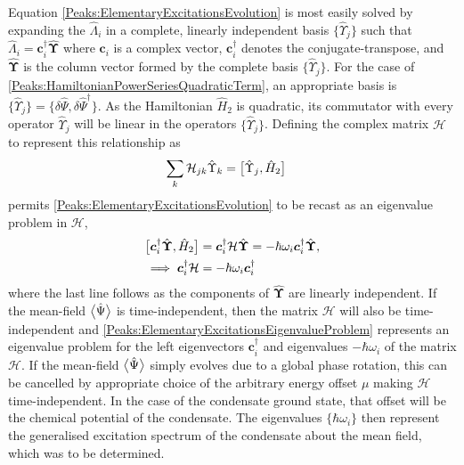 Equation \eqref{Peaks:ElementaryExcitationsEvolution} is most easily solved by expanding the $\hat{\Lambda}_i$ in a complete, linearly independent basis $\{\hat{\Upsilon}_j\}$ such that $\hat{\Lambda}_i = \bm{c}_i^\dagger \hat{\bm{\Upsilon}}$ where $\bm{c}_i$ is a complex vector, $\bm{c}_i^\dagger$ denotes the conjugate-transpose, and $\hat{\bm{\Upsilon}}$ is the column vector formed by the complete basis $\{\hat{\Upsilon}_j\}$. For the case of \eqref{Peaks:HamiltonianPowerSeriesQuadraticTerm}, an appropriate basis is $\{\hat{\Upsilon}_j\} = \{\delta\hat{\Psi}, \delta\hat{\Psi}^\dagger\}$. As the Hamiltonian $\hat{H}_2$ is quadratic, its commutator with every operator $\hat{\Upsilon}_j$ will be linear in the operators $\{\hat{\Upsilon}_j\}$. Defining the complex matrix $\mathcal{H}$ to represent this relationship as
\begin{align}
    \label{Peaks:ScriptHRelationshipToHamiltonian}
    \sum_k \mathcal{H}_{jk} \hat{\Upsilon}_k &= \comm{\hat{\Upsilon}_j, \hat{H}_2}
\end{align}
permits \eqref{Peaks:ElementaryExcitationsEvolution} to be recast as an eigenvalue problem in $\mathcal{H}$,
\begin{align}
    \comm{\bm{c}_i^\dagger \hat{\bm{\Upsilon}}, \hat{H}_2} &= \bm{c}_i^\dagger \mathcal{H} \hat{\bm{\Upsilon}} = - \hbar \omega_i \bm{c}_i^\dagger \hat{\bm{\Upsilon}}, \label{Peaks:ElementaryExcitationsEigenvalueProblemWithOperators}\\
    \implies \bm{c}_i^\dagger \mathcal{H} &= - \hbar \omega_i \bm{c}_i^\dagger \label{Peaks:ElementaryExcitationsEigenvalueProblem}
\end{align}
where the last line follows as the components of $\hat{\bm{\Upsilon}}$ are linearly independent. If the mean-field ${\big<\hat{\Psi}\big>}$ is time-independent, then the matrix $\mathcal{H}$ will also be time-independent and \eqref{Peaks:ElementaryExcitationsEigenvalueProblem} represents an eigenvalue problem for the left eigenvectors $\bm{c}_i^\dagger$ and eigenvalues $-\hbar \omega_i$ of the matrix $\mathcal{H}$. If the mean-field ${\big<\hat{\Psi}\big>}$ simply evolves due to a global phase rotation, this can be cancelled by appropriate choice of the arbitrary energy offset $\mu$ making $\mathcal{H}$ time-independent.  In the case of the condensate ground state, that offset will be the chemical potential of the condensate. The eigenvalues $\{\hbar \omega_i\}$ then represent the generalised excitation spectrum of the condensate about the mean field, which was to be determined. 

